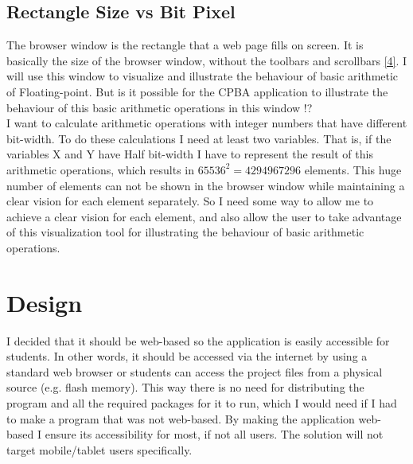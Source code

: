 \documentclass[11pt]{article}
\begin{document}


\subsection{Rectangle Size vs Bit Pixel}
The browser window is the rectangle that a web page fills on screen. It is basically the size of the browser window, without the toolbars and scrollbars \ref{4}. I will use this window to visualize and illustrate the behaviour of basic arithmetic of Floating-point. But is it possible for the CPBA application to illustrate the behaviour of this basic arithmetic operations in this window !?\\

I want to calculate arithmetic operations with integer numbers that have different bit-width. To do these calculations I need at least two variables. That is, if the variables X and Y have Half bit-width I have to represent the result of this arithmetic operations, which results in $65536^{2} = 4294967296$ elements. This huge number of elements can not be shown in the browser window while maintaining a clear vision for each element separately. So I need some way to allow me to achieve a clear vision for each element, and also allow the user to take advantage of this visualization tool for illustrating the behaviour of basic arithmetic operations.\\
\section{Design}\label{Design}
I decided that it should be web-based so the application is easily accessible for students. In other words, it should be accessed via the internet by using a standard web browser or students can access the project files from a physical source (e.g. flash memory). This way there is no need for distributing the program and all the required packages for it to run, which I would need if I had to make a program that was not web-based. By making the application web-based I ensure its accessibility for most, if not all users.
The solution will not target mobile/tablet users specifically.\\
\end{document}
